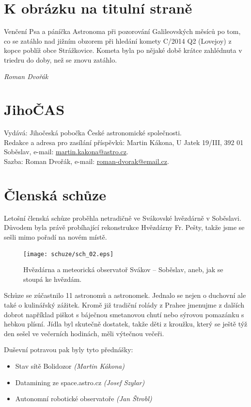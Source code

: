 \documentclass[10pt,a5paper,twoside]{book}
\newcommand{\autor}[1]{
	\begin{flushright}
	\textit{#1}
	\end{flushright}
}
\newcommand{\nadpis}[2]{
\section*{#1}
	\begin{flushright}
	\textit{#2}
	\end{flushright}
}
\begin{document}
 



\section*{K obrázku na titulní straně}
Venčení Psa a páníčka Astronoma při pozorování Galileovských měsíců po tom, co se zatáhlo nad jižním obzorem při hledání komety C/2014 Q2 \hbox{(Lovejoy)} z kopce poblíž obce Strážkovice. Kometa byla po nějaké době krátce zahlédnuta v triedru do doby, než se znovu zatáhlo.
\autor{Roman Dvořák}
\vfill
\section*{JihoČAS}
Vydává: Jihočeská pobočka České astronomické společnosti.\\
Redakce a adresa pro zasílání příspěvků: Martin Kákona, U Jatek 19/III, 392 01 Soběslav, e-mail: \href{mailto:martin.kakona@astro.cz}{martin.kakona@astro.cz}.\\
Sazba: Roman Dvořák, e-mail: \href{mailto:roman-dvorak@email.cz}{roman-dvorak@email.cz}.\newpage

\nadpis{Členská schůze}{}
Letošní členská schůze proběhla netradičně ve Svákovské hvězdárně v Soběslavi. Důvodem byla právě probíhající rekonstrukce Hvězdárny Fr. Pešty, takže jsme se sešli mimo pořadí na novém místě.

\begin{figure}[htbp]
	\begin{center}
		\texttt{[image: schuze/sch\_02.eps]}
	  	\caption{Hvězdárna a meteorická observatoř Svákov – Soběslav, aneb, jak se stoupá ke hvězdám.}
	  	\label{fig:}
	\end{center}
\end{figure}
\par
Schůze se zúčastnilo 11 astronomů a astronomek. Jednalo se nejen o duchovní ale také o kulinářský zážitek. Kromě již tradiční rolády z Prahee jmenujme z dalších dobrot například piškot s báječnou smetanovou chutí nebo sýrovou pomazánku s hebkou plísní. Jídla byl skutečně dostatek, takže děti z kroužku, který se ještě týž den sešel ve večerních hodinách, měli výtečnou večeři.

Duševní potravou pak byly tyto přednášky:
\begin{itemize}
\item Stav sítě Bolidozor \textit{(Martin Kákona)}
\item Datamining ze space.astro.cz \textit{(Josef Szylar)}
\item Autonomní robotické observatoře \textit{(Jan Štrobl)}
\end{itemize}
\end{document}
